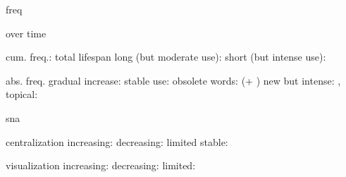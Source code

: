 
freq


  over time

    cum. freq.: total lifespan
      long (but moderate use): 
      short (but intense use): 

    abs. freq.
      gradual increase: 
      stable use: 
      obsolete words:  (+ )
      new but intense: , 
      topical: 

sna

  centralization
    increasing:
    decreasing:
    limited
    stable: 

  visualization
    increasing: 
    decreasing: 
    limited: 
